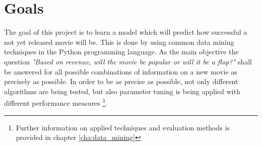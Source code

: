 \section{Goals}
The goal of this project is to learn a model which will predict how successful a not yet released movie will be. This is done by using common data mining techniques in the Python programming language. As the main objective the question \textit{"Based on revenue, will the movie be popular or will it be a flop?"} shall be answered for all possible combinations of information on a new movie as precisely as possible.
In order to be as precise as possible, not only different algorithms are being tested, but also parameter tuning is being applied with different performance measures \footnote{Further information on applied techniques and evaluation methods is provided in chapter \ref{cha:data_mining}}.








